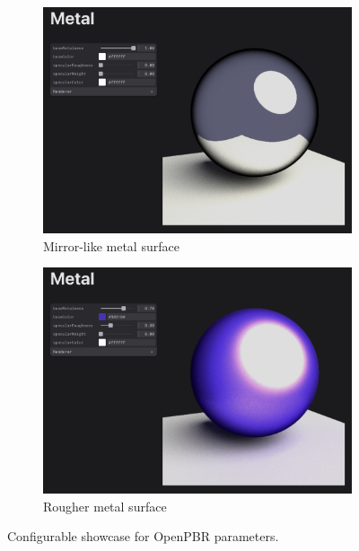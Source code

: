 \begin{figure}[H]
    \centering
    \begin{subfigure}[b]{0.45\textwidth}
        \includegraphics[width=\textwidth]{resources/docu-demo-mirror-metal.png}
        \caption{Mirror-like metal surface}
        \label{fig:docu-demo-mirror}
    \end{subfigure}
    \hfill
    \begin{subfigure}[b]{0.45\textwidth}
        \includegraphics[width=\textwidth]{resources/docu-demo-rough-metal.png}
        \caption{Rougher metal surface}
        \label{fig:docu-demo-rough}
    \end{subfigure}
    \caption{Configurable showcase for \gls{OpenPBR} parameters.}
    \label{fig:docu-demo}
\end{figure}

